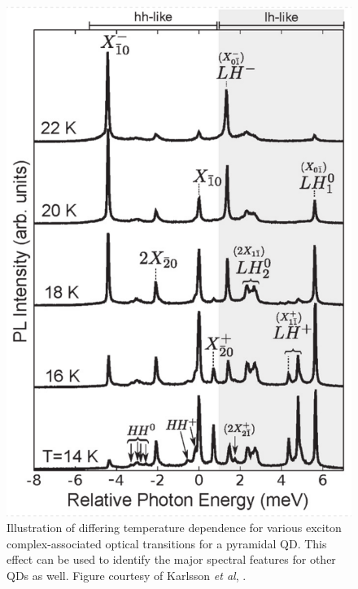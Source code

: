 \documentclass[12pt]{article}
\begin{document}
\begin{figure}
\begin{center}
\includegraphics[scale=0.6]{figures/temperature_dependence}
\end{center}
\caption{Illustration of differing temperature dependence for various exciton complex-associated optical transitions for a pyramidal QD. This effect can be used to identify the major spectral features for other QDs as well. Figure courtesy of Karlsson \textit{et al}, \cite{karlsson}.}
\label{fig:temperature}
\end{figure}
\end{document}
